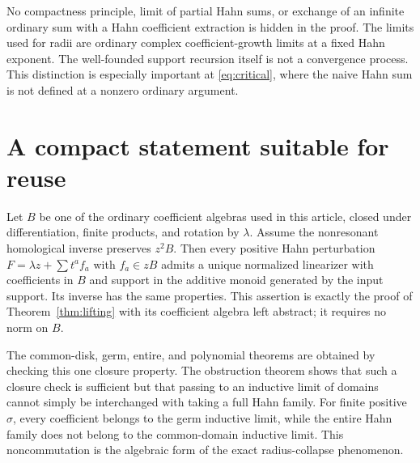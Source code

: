 \documentclass[11pt,a4paper]{article}
\numberwithin{equation}{section}
\theoremstyle{definition}
\theoremstyle{remark}
\begin{document}
No compactness principle, limit of partial Hahn sums, or exchange of an
infinite ordinary sum with a Hahn coefficient extraction is hidden in the
proof. The limits used for radii are ordinary complex coefficient-growth
limits at a fixed Hahn exponent. The well-founded support recursion itself
is not a convergence process. This distinction is especially important
at \eqref{eq:critical}, where the naive Hahn sum is not defined at a
nonzero ordinary argument.

\section{A compact statement suitable for reuse}\label{app:reusable}

Let $B$ be one of the ordinary coefficient algebras used in this article,
closed under differentiation, finite products, and rotation by $\lambda$.
Assume the nonresonant homological inverse preserves $z^2B$.
Then every positive Hahn perturbation
$F=\lambda z+\sum t^a f_a$ with $f_a\in zB$ admits a unique normalized
linearizer with coefficients in $B$ and support in the additive monoid
generated by the input support. Its inverse has the same properties.
This assertion is exactly the proof of Theorem~\ref{thm:lifting} with
its coefficient algebra left abstract; it requires no norm on $B$.

The common-disk, germ, entire, and polynomial theorems are obtained by
checking this one closure property. The obstruction theorem shows that
such a closure check is sufficient but that passing to an inductive limit
of domains cannot simply be interchanged with taking a full Hahn family.
For finite positive $\sigma$, every coefficient belongs to the germ
inductive limit, while the entire Hahn family does not belong to the
common-domain inductive limit. This noncommutation is the algebraic form
of the exact radius-collapse phenomenon.
\end{document}
